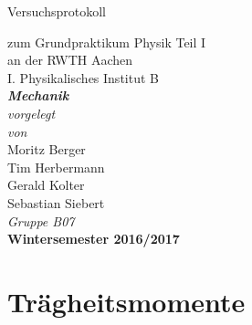 \documentclass[12pt,a4paper]{article}
\author{Moritz}
\begin{document}
\setlength{\parindent}{0pt} 
\begin{center}
{\LARGE Versuchsprotokoll}\\
\begin{large}
zum Grundpraktikum Physik Teil I\\[0.4cm]
an der RWTH Aachen\\
I. Physikalisches Institut B\\[4.5cm]
\Large\textbf{\textsl{Mechanik}}\\[4cm]
\normalsize\textit{vorgelegt\\von}\\[0.4cm]
\large{Moritz Berger\\Tim Herbermann\\Gerald Kolter\\Sebastian Siebert}\\[1cm]
\large \textit{Gruppe B07} \\ [3cm]
\large \textbf{Wintersemester 2016/2017}
\end{large}
\end{center}
\newpage

\tableofcontents
\newpage

\part*{Trägheitsmomente}
\end{document}
